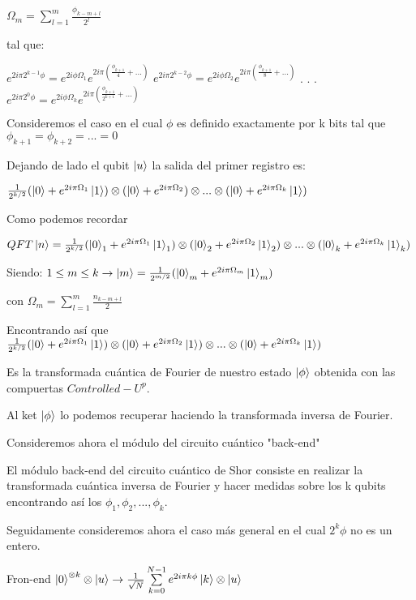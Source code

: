 $\Omega_m = \sum\limits_{l=1}^m \frac{\phi_{k-m+l}}{2^l}$

tal que:

$e^{2 i \pi 2^{k-1} \phi} = e^{2 i \phi \Omega_1} e^{2 i \pi (\frac{\phi_{k+1}}{4} + ...)}$
$e^{2 i \pi 2^{k-2} \phi} = e^{2 i \phi \Omega_2} e^{2 i \pi (\frac{\phi_{k+1}}{8} + ...)}$
.
.
.
$e^{2 i \pi 2^0 \phi} = e^{2 i \phi \Omega_k} e^{2 i \pi (\frac{\phi_{k+1}}{2^{k+1}} + ...)}$

Consideremos el caso en el cual $\phi$ es definido exactamente por k bits tal que $\phi_{k+1} = \phi_{k+2} = ... = 0$

Dejando de lado el qubit $\ket{u}$ la salida del primer registro es:

$\frac{1}{2^{k/2}} (\ket{0} + e^{2 i \pi \Omega_1} \ket{1}) \otimes (\ket{0} + e^{2 i \pi \Omega_2}) \otimes ... \otimes (\ket{0} + e^{2 i \pi \Omega_k} \ket{1})$

Como podemos recordar

$QFT \ket{n} = \frac{1}{2^{k/2}} (\ket{0}_1 + e^{2 i \pi \Omega_1} \ket{1}_1) \otimes (\ket{0}_2 +  e^{2 i \pi \Omega_2} \ket{1}_2) \otimes ... \otimes (\ket{0}_k + e^{2 i \pi \Omega_k} \ket{1}_k)$

Siendo: $1 \leq m \leq k \rightarrow \ket{m} = \frac{1}{2^{m/2}} (\ket{0}_m + e^{2 i \pi \Omega_m} \ket{1}_m)$

con $\Omega_m = \sum\limits_{l=1}^m \frac{n_{k-m+l}}{2}$

Encontrando así que $\frac{1}{2^{k/2}} (\ket{0} + e^{2 i \pi \Omega_1} \ket{1}) \otimes (\ket{0} + e^{2 i \pi \Omega_2} \ket{1}) \otimes ... \otimes (\ket{0} + e^{2 i \pi \Omega_k} \ket{1})$

Es la transformada cuántica de Fourier de nuestro estado $\ket{\phi}$ obtenida con las compuertas $Controlled-U^p$.

Al ket $\ket{\phi}$ lo podemos recuperar haciendo la transformada inversa de Fourier.

Consideremos ahora el módulo del circuito cuántico "back-end"


El módulo back-end del circuito cuántico de Shor consiste en realizar la transformada cuántica inversa de Fourier y hacer medidas sobre los k qubits encontrando así los $\phi_1, \phi_2,...,\phi_k$.

Seguidamente consideremos ahora el caso más general en el cual $2^k \phi$ no es un entero.

Fron-end $\ket{0}^{\otimes k} \otimes \ket{u} \rightarrow \frac{1}{\sqrt{N}} \sum\limits_{k=0}^{N-1} e^{2 i \pi k \phi} \ket{k} \otimes \ket{u}$

